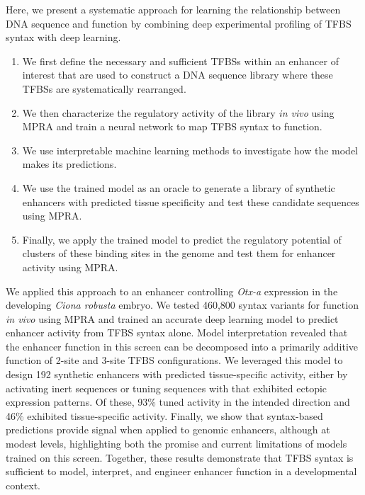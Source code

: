 Here, we present a systematic approach for learning the relationship between DNA sequence and function by combining deep experimental profiling of TFBS syntax with deep learning.

\begin{enumerate}
    \item We first define the necessary and sufficient TFBSs within an enhancer of interest that are used to construct a DNA sequence library where these TFBSs are systematically rearranged.
    \item We then characterize the regulatory activity of the library \textit{in vivo} using MPRA and train a neural network to map TFBS syntax to function.
    \item We use interpretable machine learning methods to investigate how the model makes its predictions.
    \item We use the trained model as an oracle to generate a library of synthetic enhancers with predicted tissue specificity and test these candidate sequences using MPRA.
    \item Finally, we apply the trained model to predict the regulatory potential of clusters of these binding sites in the genome and test them for enhancer activity using MPRA.
\end{enumerate}

We applied this approach to an enhancer controlling \textit{Otx-a} expression in the developing \textit{Ciona robusta} embryo. We tested 460,800 syntax variants for function \textit{in vivo} using MPRA and trained an accurate deep learning model to predict enhancer activity from TFBS syntax alone. Model interpretation revealed that the enhancer function in this screen can be decomposed into a primarily additive function of 2-site and 3-site TFBS configurations. We leveraged this model to design 192 synthetic enhancers with predicted tissue-specific activity, either by activating inert sequences or tuning sequences with that exhibited ectopic expression patterns. Of these, 93\% tuned activity in the intended direction and 46\% exhibited tissue-specific activity. Finally, we show that syntax-based predictions provide signal when applied to genomic enhancers, although at modest levels, highlighting both the promise and current limitations of models trained on this screen. Together, these results demonstrate that TFBS syntax is sufficient to model, interpret, and engineer enhancer function in a developmental context.

